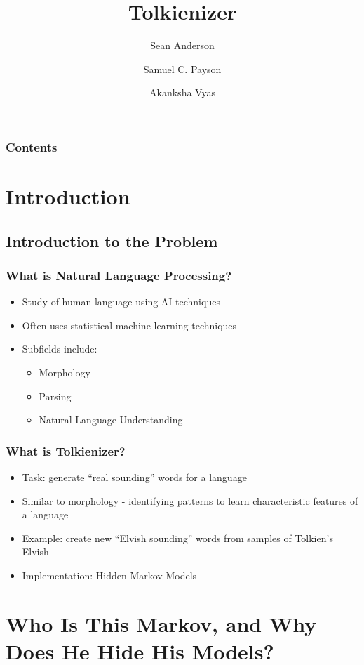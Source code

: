 \documentclass{beamer}
\title{Tolkienizer}
\author{Sean Anderson \and Samuel C. Payson \and Akanksha Vyas}
\begin{document}
\begin{frame}
\titlepage
\end{frame}

\begin{frame}
   \frametitle{Contents}
   \tableofcontents[pausesections]
\end{frame}

\section{Introduction}

\subsection{Introduction to the Problem}

\begin{frame}
   \frametitle{What is Natural Language Processing?}
   \begin{itemize}
      \item Study of human language using AI techniques
      \item Often uses statistical machine learning techniques
      \item Subfields include:
      \begin{itemize}
         \item Morphology
         \item Parsing
         \item Natural Language Understanding
      \end{itemize}
   \end{itemize}
\end{frame}

\begin{frame}
   \frametitle{What is Tolkienizer?}
   \begin{itemize}
      \item Task: generate ``real sounding'' words for a language
      \item Similar to morphology - identifying patterns to learn
      characteristic features of a language
      \item Example: create new ``Elvish sounding'' words from samples of Tolkien's Elvish
      \item Implementation: Hidden Markov Models
   \end{itemize}
\end{frame}

\section{Who Is This Markov, and Why Does He Hide His Models?}
\end{document}

